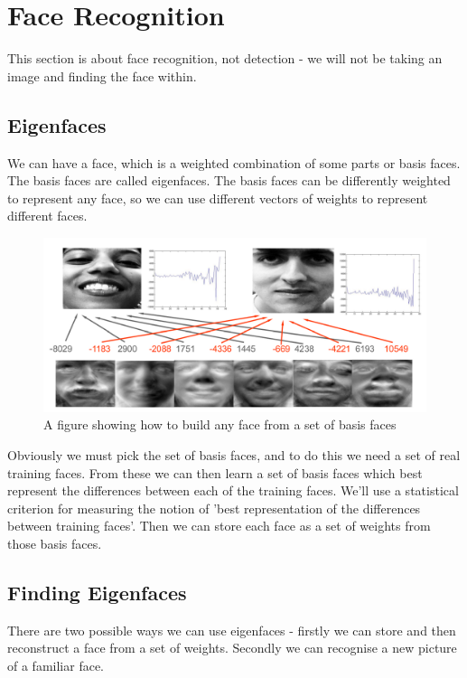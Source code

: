 \documentclass{article}
\begin{document}
	\section{Face Recognition}
	This section is about face recognition, not detection - we will not be taking an image and finding the face within.
	
	\subsection{Eigenfaces}
	We can have a face, which is a weighted combination of some parts or basis faces. The basis faces are called eigenfaces. The basis faces can be differently weighted to represent any face, so we can use different vectors of weights to represent different faces.
	
	\begin{figure}[h]
		\centering
		\includegraphics[width=\textwidth]{eigenfaces}
		\caption{A figure showing how to build any face from a set of basis faces}
		\label{fig:eigenfaces}
	\end{figure}
	
	Obviously we must pick the set of basis faces, and to do this we need a set of real training faces. From these we can then learn a set of basis faces which best represent the differences between each of the training faces. We'll use a statistical criterion for measuring the notion of 'best representation of the differences between training faces'. Then we can store each face as a set of weights from those basis faces.
	
	\subsection{Finding Eigenfaces}
	There are two possible ways we can use eigenfaces - firstly we can store and then reconstruct a face from a set of weights. Secondly we can recognise a new picture of a familiar face.
	
\end{document}
